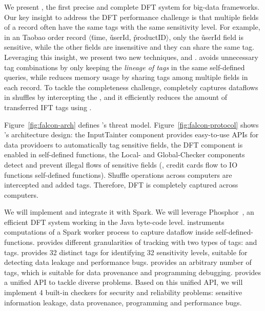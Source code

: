 We present \kakute, the first precise and complete DFT system for big-data 
frameworks. Our key insight to address the DFT performance challenge is that 
multiple fields of a record often have the same tags with the same sensitivity 
level. For example, in an Taobao order record $\langle$\v{time}, 
\v{userId}, \v{productID}$\rangle$, only the \v{userId} field is 
sensitive, while the other fields are insensitive and they can share the same 
tag. Leveraging this insight, we present two new techniques, \lazyp and 
\tagcache. \lazyp avoids unnecessary tag combinations by only keeping the 
\textit{lineage of tags} in the same self-defined queries, while \tagcache 
reduces memory usage by sharing tags among multiple fields in each record. To 
tackle the completeness challenge, \kakute completely captures dataflows in 
shuffles by intercepting the , and it efficiently reduces the amount of 
transferred IFT tags using \tagcache.

Figure~\ref{fig:falcon-arch} defines \kakute's threat 
model. Figure~\ref{fig:falcon-protocol} shows \kakute's architecture 
design: the InputTainter component provides easy-to-use APIs for 
data providoers to automatically tag sensitive fields, the DFT component is 
enabled in self-defined functions, the Local- and Global-Checker components 
detect and prevent illegal flows of sensitive fields (\eg, credit cards flow to 
IO functions self-defined functions). Shuffle operations across computers are 
intercepted and added tags. Therefore, DFT is completely captured across 
computers.

We will implement \kakute and integrate it with Spark. We will leverage 
Phosphor~\cite{oo14:phosphor}, an efficient DFT system working in the Java 
byte-code level. \kakute instruments computations of a Spark worker process
to capture dataflow inside self-defined-functions. \kakute provides different 
granularities of tracking with two types of tags: 
and  tags.  provides 32 distinct tags for 
identifying 32 sensitivity levels, suitable for detecting data leakage and 
performance bugs.  provides an arbitrary number of tags, which is 
suitable for data provenance and programming debugging. \kakute provides a 
unified API to tackle diverse problems. Based on this unified API, we 
will implement 4 built-in checkers for \appsn security and reliability 
problems: sensitive information leakage, data provenance, programming and 
performance bugs.

